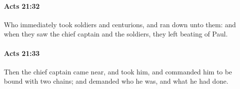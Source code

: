 		\paragraph{Acts 21:32} %
			\label{ACTS-21-32}

			Who immediately took soldiers and centurions, and ran down unto them: and when they saw the chief captain and the soldiers, they left beating of Paul.

			\begin{framed}
			\scriptsize
				\begin{compactdesc}
					\item[SBLG] 
				\end{compactdesc}
			\end{framed}

		\paragraph{Acts 21:33} %
			\label{ACTS-21-33}

			Then the chief captain came near, and took him, and commanded him to be bound with two chains; and demanded who he was, and what he had done.

